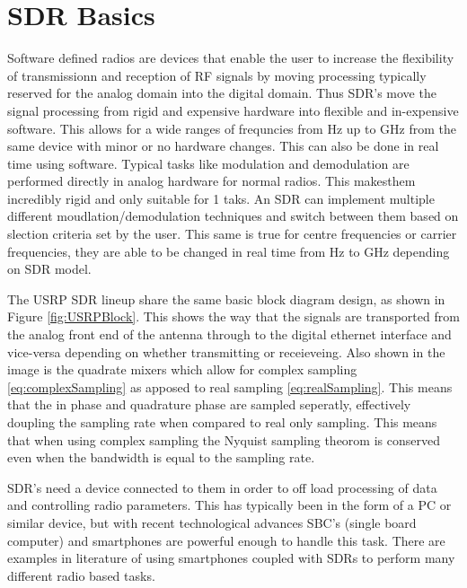 
\section{SDR Basics}
Software defined radios are devices that enable the user to increase the flexibility of transmissionn and reception of RF signals by moving processing typically reserved
for the analog domain into the digital domain. Thus SDR's move the signal processing from rigid and expensive hardware into flexible and in-expensive software. This
allows for a wide ranges of frequncies from Hz up to GHz from the same device with minor or no hardware changes. This can also be done in real time using software.
Typical tasks like modulation and demodulation are performed directly in analog hardware for normal radios. This makesthem incredibly rigid and only suitable for 1 taks.
An SDR can implement multiple different moudlation/demodulation techniques and switch between them based on slection criteria set by the user. This same is true for
centre frequencies or carrier frequencies, they are able to be changed in real time from Hz to GHz depending on SDR model.

The USRP SDR lineup share the same basic block diagram design, as shown in Figure \ref{fig:USRPBlock}. This shows the way that the signals are transported from the analog
front end of the antenna through to the digital ethernet interface and vice-versa depending on whether transmitting or receieveing. Also shown in the image is the
quadrate mixers which allow for complex sampling \ref{eq:complexSampling} as apposed to real sampling \ref{eq:realSampling}. This means that the in phase and quadrature phase are sampled seperatly, effectively
doupling the sampling rate when compared to real only sampling. This means that when using complex sampling the Nyquist sampling theorom is conserved even when the
bandwidth is equal to the sampling rate.

SDR's need a device connected to them in order to off load processing of data and controlling radio parameters. This has typically been in the form of a PC or similar
device, but with recent technological advances SBC's (single board computer) and smartphones are powerful enough to handle this task. There are examples in literature of
using smartphones coupled with SDRs to perform many different radio based tasks.


